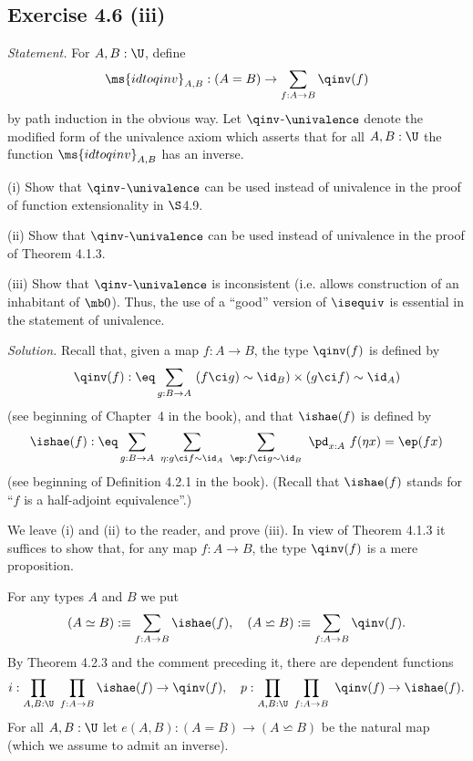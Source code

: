 \documentclass[12pt]{article}
\begin{document}

\subsection{Exercise 4.6 (iii)}

\emph{Statement.} For $A,B:\U$, define
$$
\ms{idtoqinv}_{A,B}:(A=B)\to\sum_{f:A\to B}\qinv(f)
$$
by path induction in the obvious way. Let $\qinv$-$\univalence$ denote the modified form of the univalence axiom which asserts that for all $A,B:\U$ the function $\ms{idtoqinv}_{A,B}$ has an inverse.

\nn(i) Show that $\qinv$-$\univalence$ can be used instead of univalence in the proof of function extensionality in $\S$4.9.

\nn(ii) Show that $\qinv$-$\univalence$ can be used instead of univalence in the proof of Theorem 4.1.3.

\nn(iii) Show that $\qinv$-$\univalence$ is inconsistent (i.e. allows construction of an inhabitant of $\mb0$). Thus, the use of a ``good'' version of $\isequiv$ is essential in the statement of univalence.

\nn\emph{Solution.} Recall that, given a map $f:A\to B$, the type $\qinv(f)$ is defined by 
\begin{equation}\label{qinv}
\qinv(f):\eq\sum_{g:B\to A}\ (f\ci g)\sim\id_B)\times(g\ci f)\sim\id_A)
\end{equation}
(see beginning of Chapter~4 in the book), and that $\ishae(f)$ is defined by 
\begin{equation}\label{ishae}
\ishae(f):\eq\sum_{g:B\to A}\ \sum_{\eta:g\ci f\sim\id_A}\ \sum_{\ep:f\ci g\sim\id_B}\ \pd_{x:A}\ f(\eta x)=\ep(fx)
\end{equation}
(see beginning of Definition 4.2.1 in the book). (Recall that $\ishae(f)$ stands for ``$f$ is a half-adjoint equivalence''.) 

We leave (i) and (ii) to the reader, and prove (iii). In view of Theorem 4.1.3 it suffices to show that, for any map $f:A\to B$, the type $\qinv(f)$ is a mere proposition. 

For any types $A$ and $B$ we put 
$$
(A\simeq B):\equiv\sum_{f:A\to B}\ishae(f),\quad(A\backsimeq B):\equiv\sum_{f:A\to B}\qinv(f).
$$ 
By Theorem 4.2.3 and the comment preceding it, there are dependent functions 
$$
i:\prod_{A,B:\U}\ \prod_{f:A\to B}\ishae(f)\to\qinv(f),\quad p:\prod_{A,B:\U}\ \prod_{f:A\to B}\ \qinv(f)\to\ishae(f).
$$ 
For all $A,B:\U$ let $e(A,B):(A=B)\to(A\backsimeq B)$ be the natural map (which we assume to admit an inverse).
\end{document}
